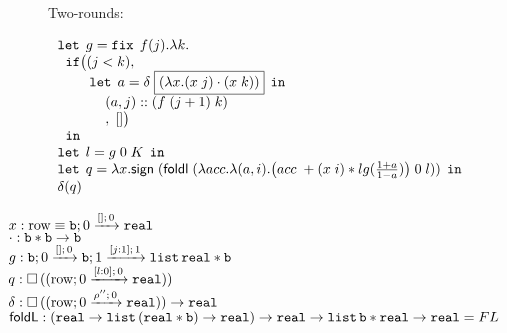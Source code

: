 \documentclass[a4paper,11pt]{article}
\theoremstyle{definition}
\begin{document}
\newpage
\begin{figure}

Two-rounds:

\[
\begin{array}{l}
 \elet \eapp  g = \efix \eapp  f(j). \lambda k.  \\
 \hspace{.2cm} \eif \big (  (j < k)  ,  \\
  \hspace{.8cm} \elet \eapp  a = \eop \eapp  \boxed{( \lambda x. (x \eapp j)\cdot (x \eapp k) )}  \eapp  \ein \\
  \hspace{1.2cm} (a, j) :: (f  \eapp (j+1) \eapp  k) \\
 \hspace{1.2cm} , \eapp  [] \big) \\
  \hspace{.2cm} \ein \\
  \elet \eapp  l = g \eapp  0\eapp  K \eapp  \ein \\
  \elet \eapp   q =  \lambda x. \mathsf{sign} \eapp  (\mathsf{foldl} \eapp  (\lambda acc. \lambda (a,i). \big(acc\eapp + (x \eapp  i) *lg(\frac{1+a}{1-a})  \big) \eapp  0 \eapp  l )) \eapp  \ein \\
  \eop ( q )
\end{array}
\]
\end{figure}


\begin{tabbing}
    $ x: \trow \equiv \tarr{\tbase}{\treal}{0}{[]}{0}$ \\
    $ \cdot: \tbase * \tbase \to \tbase $   \\
    $ g: \tarr{ \tbase }{ \tarr{\tbase}{\tlist{\treal * \tbase}}{1}{[j:1]}{1} }{0}{[]}{0}  $\\
    $ q: \tbox{  (\tarr{ \trow }{ \treal }{0}{[l:0]}{0})     } $\\
    $ \eop : \tbox{  (\tarr{ \trow }{ \treal }{0}{\dmap''}{0})     } \to \treal $\\
    $\mathsf{foldL} : (\treal \to \tlist{(\treal * \tbase)} \to \treal) \to \treal \to \tlist{\tbase * \treal} \to \treal = FL$
\end{tabbing}
\end{document}
